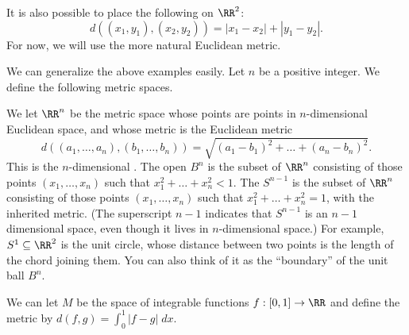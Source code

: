 \begin{example}[Taxicab on $\RR^2$]
	It is also possible to place the following  on $\RR^2$:
	\[ d\left( (x_1, y_1), (x_2, y_2) \right) = 
		\left\lvert x_1-x_2 \right\rvert + \left\lvert y_1-y_2 \right\rvert.
		\]
	For now, we will use the more natural Euclidean metric.
\end{example}

\begin{example}
	We can generalize the above examples easily.
	Let $n$ be a positive integer. We define the following metric spaces.
	\begin{enumerate}[(a)]
		\ii We let $\RR^n$ be the metric space whose points are points in $n$-dimensional Euclidean space, and whose metric is the Euclidean metric
		\[
			d\left( 
			\left( a_1, \dots, a_n \right), \left( b_1, \dots, b_n \right)
			\right)
			= \sqrt{(a_1-b_1)^2 + \dots + (a_n-b_n)^2}.
		\]
		This is the $n$-dimensional .
		\ii The open  $B^{n}$ is the subset of $\RR^n$
		consisting of those points $\left( x_1, \dots, x_n \right)$
		such that $x_1^2 + \dots + x_n^2 < 1$.
		\ii The  $S^{n-1}$ is the subset of $\RR^n$
		consisting of those points $\left( x_1, \dots, x_n \right)$
		such that $x_1^2 + \dots + x_n^2 = 1$, with the inherited metric.
		(The superscript $n-1$ indicates that $S^{n-1}$ is an  $n-1$ dimensional space, even though it lives in $n$-dimensional space.)
		For example, $S^1 \subseteq \RR^2$ is the unit circle, whose distance between two points is the length of the chord joining them.
		You can also think of it as the ``boundary'' of the unit ball $B^n$.
	\end{enumerate}
\end{example}
\begin{example}
	 We can let $M$ be the space of
	integrable functions $f : [0,1] \to \RR$ and define the metric
	by $d(f,g) = \int_0^1 \left\lvert f-g \right\rvert \; dx$.
\end{example}

